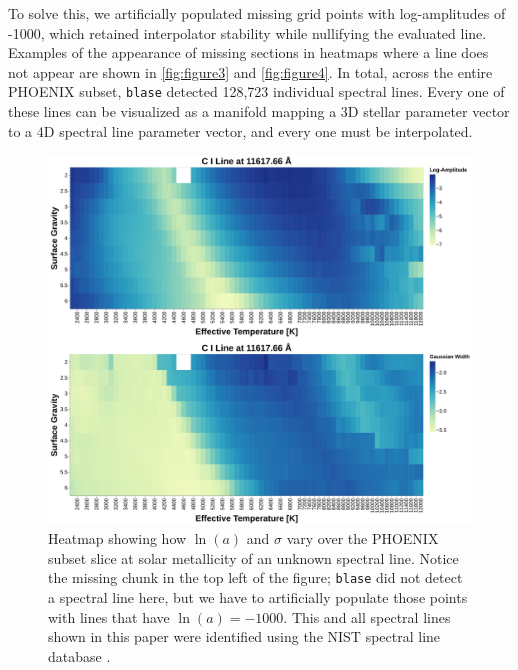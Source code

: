 \documentclass[twocolumn, linenumbers]{aastex631}
\begin{document}
To solve this, we artificially populated missing grid points with log-amplitudes of -1000, which retained interpolator stability while nullifying the evaluated line. 
Examples of the appearance of missing sections in heatmaps where a line does not appear are shown in \autoref{fig:figure3} and \autoref{fig:figure4}. 
In total, across the entire PHOENIX subset, \texttt{blase} detected 128,723 individual spectral lines.  
Every one of these lines can be visualized as a manifold mapping a 3D stellar parameter vector to a 4D spectral line parameter vector, and every one must be interpolated.
\begin{figure}
    \centering
    \includegraphics[width=\textwidth]{figure3}
    \caption{Heatmap showing how $\ln(a)$ and $\sigma$ vary over the PHOENIX subset slice at solar metallicity of an unknown spectral line. 
    Notice the missing chunk in the top left of the figure; \texttt{blase} did not detect a spectral line here, but we have to artificially populate those points with lines that have $\ln(a) = -1000$.
    This and all spectral lines shown in this paper were identified using the NIST spectral line database \citep{NIST}.}
    \label{fig:figure3}
\end{figure}
\end{document}
